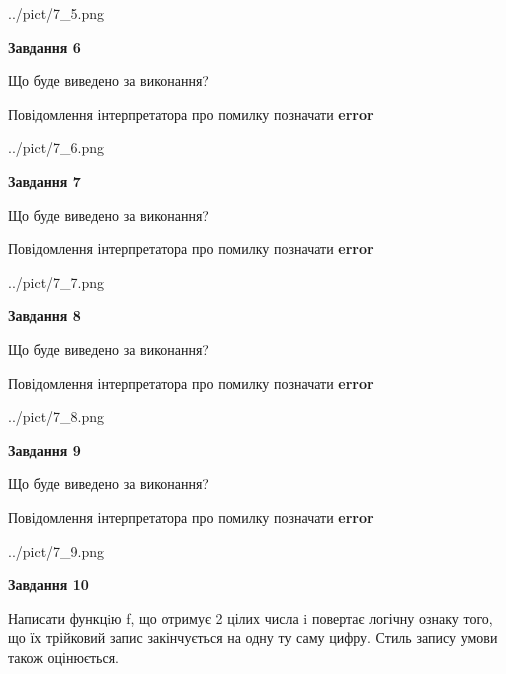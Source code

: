 \documentclass[12pt, ukrainian]{article}
\begin{document}
{\begin {large}
\begin{center}
	{../pict/7_5.png}
\end{center}
\newpage

{\begin {center}\textbf{Завдання 6}\end {center}}\par
Що буде виведено за виконання? \par
Повідомлення інтерпретатора про помилку позначати \textbf{error}

\begin{center}
	{../pict/7_6.png}
\end{center}
\newpage

{\begin {center}\textbf{Завдання 7}\end {center}}\par
Що буде виведено за виконання? \par
Повідомлення інтерпретатора про помилку позначати \textbf{error}

\begin{center}
	{../pict/7_7.png}
\end{center}
\newpage

{\begin {center}\textbf{Завдання 8}\end {center}}\par
Що буде виведено за виконання? \par
Повідомлення інтерпретатора про помилку позначати \textbf{error}

\begin{center}
	{../pict/7_8.png}
\end{center}
\newpage

{\begin {center}\textbf{Завдання 9}\end {center}}\par
Що буде виведено за виконання? \par
Повідомлення інтерпретатора про помилку позначати \textbf{error}

\begin{center}
	{../pict/7_9.png}
\end{center}
\newpage

{\begin {center}\textbf{Завдання 10}\end {center}}\par

Написати функцiю f, що отримує 2 цілих числа i повертає логічну ознаку того, що їх трійковий запис закінчується на одну ту саму цифру. Стиль запису умови також оцінюється.\par
\newpage

\end {large}}
\end{document}
